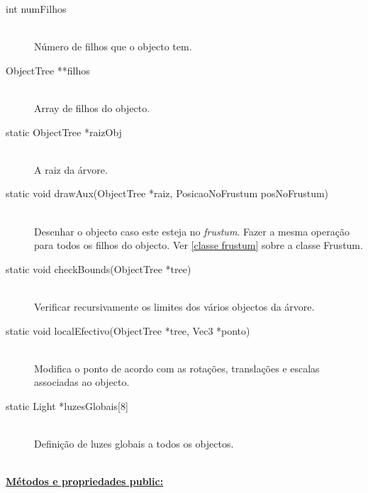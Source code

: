 \documentclass[a5paper,onecolumn, 11pt]{article}
\begin{document}
\begin{description}
	\item[int numFilhos] \hfill \\
	Número de filhos que o objecto tem.

	\item[ObjectTree **filhos] \hfill \\
	Array de filhos do objecto.

	\item[static ObjectTree *raizObj] \hfill \\
	A raiz da árvore.

	\item[static void drawAux(ObjectTree *raiz, PosicaoNoFrustum posNoFrustum)] \hfill \\
	Desenhar o objecto caso este esteja no \textit{frustum}. Fazer a mesma operação para todos os filhos do objecto. Ver \ref{classe frustum} sobre a classe Frustum.

	\item[static void checkBounds(ObjectTree *tree)] \hfill \\
	Verificar recursivamente os limites dos vários objectos da árvore.

	\item[static void localEfectivo(ObjectTree *tree, Vec3 *ponto)] \hfill \\
	Modifica o ponto de acordo com as rotações, translações e escalas associadas ao objecto.

	\item[static Light *luzesGlobais{[8]}] \hfill \\
	Definição de luzes globais a todos os objectos.
\end{description}

\hfill \\ \underline{\textbf{Métodos e propriedades public:}}
\end{document}
